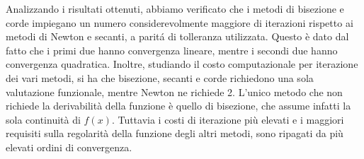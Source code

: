\begin{table}[H]
	\centering
\end{table}
Analizzando i risultati ottenuti, abbiamo verificato che i metodi di bisezione e corde impiegano
un numero considerevolmente maggiore di iterazioni rispetto ai metodi di Newton e secanti, a paritá di tolleranza utilizzata.
Questo è dato dal fatto che i primi due hanno convergenza lineare, mentre i secondi due hanno convergenza quadratica.
Inoltre, studiando il costo computazionale per iterazione dei vari metodi, si ha che bisezione, secanti e corde richiedono una sola valutazione funzionale, mentre Newton ne richiede 2. L'unico metodo che non richiede la derivabilità della funzione è quello di bisezione, che assume infatti la sola continuità di $f(x)$.
Tuttavia i costi di iterazione più elevati e i maggiori requisiti sulla regolarità della funzione degli altri metodi, sono ripagati da più elevati ordini di convergenza.
